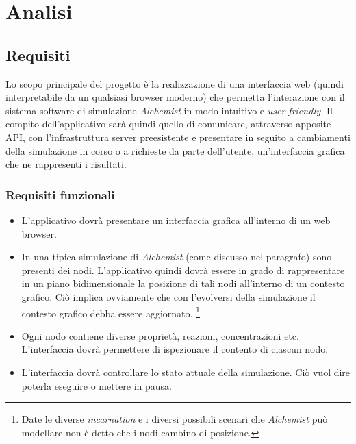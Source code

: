 \chapter{Analisi}

\section{Requisiti}

Lo scopo principale del progetto è la realizzazione di una interfaccia web (quindi interpretabile da un qualsiasi browser moderno) che permetta l'interazione con il sistema software di simulazione
\textit{Alchemist} in modo intuitivo e \textit{user-friendly}. Il compito dell'applicativo sarà quindi quello di comunicare, attraverso apposite \ac{API}, con l'infrastruttura server preesistente e presentare in seguito a cambiamenti della simulazione in corso o a richieste da parte dell'utente, un'interfaccia grafica che ne rappresenti i risultati.
\subsection{Requisiti funzionali}
\begin{itemize}
	\item L'applicativo dovrà presentare un interfaccia grafica all'interno di un web browser.
	\item In una tipica simulazione di \textit{Alchemist} (come discusso nel paragrafo) sono presenti dei nodi. L'applicativo quindi dovrà essere in grado di rappresentare in un piano bidimensionale la posizione di tali nodi all'interno di un contesto grafico. Ciò implica ovviamente che con l'evolversi della simulazione il contesto grafico debba essere aggiornato. \footnote{Date le diverse \textit{incarnation} e i diversi possibili scenari che \textit{Alchemist} può modellare non è detto che i nodi cambino di posizione.}
	\item Ogni nodo contiene diverse proprietà, reazioni, concentrazioni etc. L'interfaccia dovrà permettere di ispezionare il contento di ciascun nodo. 
	\item L'interfaccia dovrà controllare lo stato attuale della simulazione. Ciò vuol dire poterla eseguire o mettere in pausa.
\end{itemize}

